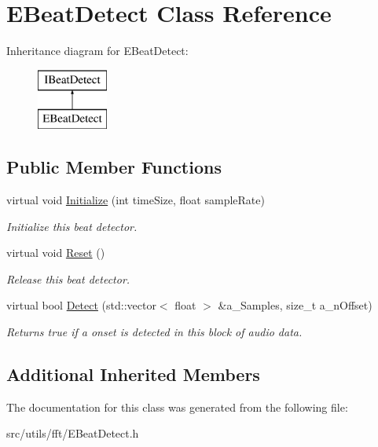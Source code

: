 \hypertarget{class_e_beat_detect}{}\section{E\+Beat\+Detect Class Reference}
\label{class_e_beat_detect}
Inheritance diagram for E\+Beat\+Detect\+:\begin{figure}[H]
\begin{center}
\leavevmode
\includegraphics[height=2.000000cm]{class_e_beat_detect}
\end{center}
\end{figure}
\subsection*{Public Member Functions}
\begin{DoxyCompactItemize}
\item 
\mbox{\label{class_e_beat_detect_a1e735285d9d7b623c81c23edc72897ca}} 
virtual void \hyperlink{class_e_beat_detect_a1e735285d9d7b623c81c23edc72897ca}{Initialize} (int time\+Size, float sample\+Rate)
\begin{DoxyCompactList}\small\item\em Initialize this beat detector. \end{DoxyCompactList}\item 
\mbox{\label{class_e_beat_detect_abc1a0d7e9168a2fd76333d2ab61cfced}} 
virtual void \hyperlink{class_e_beat_detect_abc1a0d7e9168a2fd76333d2ab61cfced}{Reset} ()
\begin{DoxyCompactList}\small\item\em Release this beat detector. \end{DoxyCompactList}\item 
\mbox{\label{class_e_beat_detect_aeb554bcf0fa1974f0fe3f8ad5b403712}} 
virtual bool \hyperlink{class_e_beat_detect_aeb554bcf0fa1974f0fe3f8ad5b403712}{Detect} (std\+::vector$<$ float $>$ \&a\+\_\+\+Samples, size\+\_\+t a\+\_\+n\+Offset)
\begin{DoxyCompactList}\small\item\em Returns true if a onset is detected in this block of audio data. \end{DoxyCompactList}\end{DoxyCompactItemize}
\subsection*{Additional Inherited Members}


The documentation for this class was generated from the following file\+:\begin{DoxyCompactItemize}
\item 
src/utils/fft/E\+Beat\+Detect.\+h\end{DoxyCompactItemize}
